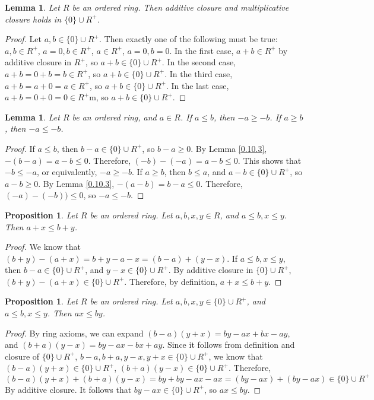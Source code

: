\documentclass{article}
\newtheorem{lem}[thm]{Lemma}
\newtheorem{prop}[thm]{Proposition}
\begin{document}
\begin{lem}
\label{0.10.4}
Let $R$ be an ordered ring. Then additive closure and multiplicative closure holds in $\{0\} \cup R^+$.
\end{lem}

\begin{proof}
Let $a, b \in \{0\} \cup R^+$. Then exactly one of the following must be true: $a, b \in R^+$, $a=0, b\in R^+$, $a \in R^+$, $a=0, b=0$. In the first case, $a+b \in R^+$ by additive closure in $R^+$, so $a+b \in \{0\} \cup R^+$. In the second case, $a+b=0+b=b \in R^+$, so $a+b \in \{0\} \cup R^+$. In the third case, $a+b=a+0=a\in R^+$, so $a+b \in \{0\} \cup R^+$. In the last case, $a+b=0+0=0\in R^+$m, so $a+b \in \{0\} \cup R^+$.
\end{proof}

\begin{lem}
\label{0.10.5}
Let $R$ be an ordered ring, and $a \in R$. If $a\leq b$, then $-a\geq-b$. If $a\geq b$, then $-a\leq-b$.
\end{lem}

\begin{proof}
If $a \leq b$, then $b-a \in \{0\} \cup R^+$, so $b-a \geq 0$. By Lemma \ref{0.10.3}, $-(b-a)=a-b \leq 0$. Therefore, $(-b)-(-a)=a-b \leq 0$. This shows that $-b \leq -a$, or equivalently, $-a \geq -b$. If $a \geq b$, then $b \leq a$, and $a-b \in \{0\} \cup R^+$, so $a-b \geq 0$. By Lemma \ref{0.10.3}, $-(a-b)=b-a \leq 0$. Therefore, $(-a)-(-b)) \leq 0$, so $-a \leq -b$.
\end{proof}

\begin{prop}
\label{0.10.1}
Let $R$ be an ordered ring. Let $a,b,x,y\in R$, and $a \leq b, x \leq y$. Then $a+x \leq b+y$.
\end{prop}

\begin{proof}
We know that $(b+y)-(a+x) = b+y-a-x=(b-a)+(y-x)$. If $a \leq b, x \leq y$, then $b-a \in \{0\} \cup R^+$, and $y-x \in \{0\} \cup R^+$. By additive closure in $\{0\} \cup R^+$, $(b+y)-(a+x) \in \{0\} \cup R^+$. Therefore, by definition, $a+x \leq b+y$.
\end{proof}

\begin{prop}
\label{0.10.2}
Let $R$ be an ordered ring. Let $a,b, x, y \in \{0\} \cup R^+$, and $a \leq b, x \leq y$. Then $ax \leq by$.  
\end{prop}


\begin{proof}
By ring axioms, we can expand $(b-a)(y+x)= by-ax+bx-ay$, and $(b+a)(y-x)=by-ax-bx+ay$. Since it follows from definition and closure of $\{0\} \cup R^+$, $b-a, b+a, y-x, y+x \in \{0\} \cup R^+$, we know that $(b-a)(y+x) \in \{0\} \cup R^+$, $(b+a)(y-x) \in \{0\} \cup R^+$. Therefore, 
$$(b-a)(y+x)+(b+a)(y-x) = by+by-ax-ax=(by-ax)+(by-ax) \in \{0\} \cup R^+$$
By additive closure. It follows that $by-ax \in \{0\} \cup R^+$, so $ax \leq by$.
\end{proof}
\end{document}
